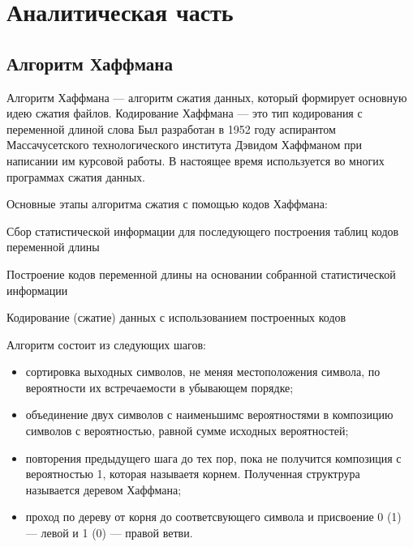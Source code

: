 \chapter{Аналитическая часть}

\section{Алгоритм Хаффмана}

Алгоритм Хаффмана --- алгоритм сжатия данных, который формирует основную идею сжатия файлов. 
Кодирование Хаффмана --- это тип кодирования с переменной длиной слова
Был разработан в 1952 году аспирантом Массачусетского технологического института Дэвидом Хаффманом при написании им курсовой работы. 
В настоящее время используется во многих программах сжатия данных.

Основные этапы алгоритма сжатия с помощью кодов Хаффмана:

Сбор статистической информации для последующего построения таблиц кодов переменной длины

Построение кодов переменной длины на основании собранной статистической информации

Кодирование (сжатие) данных с использованием построенных кодов

Алгоритм состоит из следующих шагов:
\begin{itemize}
	\item сортировка выходных символов, не меняя местоположения символа, по вероятности их встречаемости в убывающем порядке;
	\item объединение двух символов с наименьшимс вероятностями в композицию символов с вероятностью, равной сумме исходных вероятностей;
	\item повторения предыдущего шага до тех пор, пока не получится композиция с вероятностью 1, которая называетя корнем. Полученная структрура называется деревом Хаффмана;
	\item проход по дереву от корня до соответсвующего символа и присвоение 0 (1) --- левой и 1 (0) --- правой ветви. 
\end{itemize}



